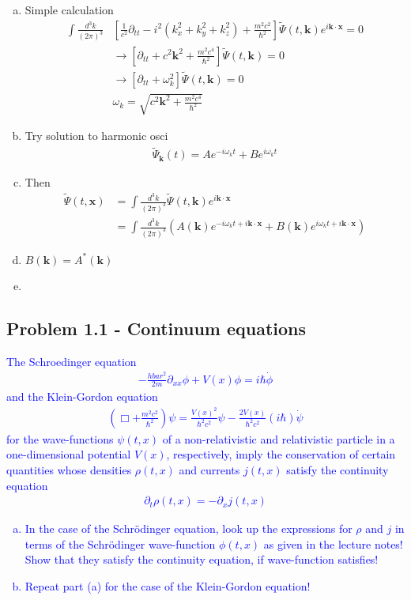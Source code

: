 \documentclass[../main.tex]{subfiles}
\begin{document}
\begin{enumerate}[(a)]
\item Simple calculation
\begin{align}
\int\frac{d^3k}{(2\pi)^3}&\left[\frac{1}{c^2}\partial_{tt}-i^2(k_x^2+k_y^2+k_z^2)+\frac{m^2c^2}{\hbar^2}\right]\tilde{\Psi}(t,\mathbf{k})e^{i\mathbf{k}\cdot\mathbf{x}}=0\\
&\rightarrow\left[\partial_{tt}+c^2\mathbf{k}^2+\frac{m^2c^4}{\hbar^2}\right]\tilde{\Psi}(t,\mathbf{k})=0\\
&\rightarrow\left[\partial_{tt}+\omega_k^2\right]\tilde{\Psi}(t,\mathbf{k})=0\\
&\omega_k=\sqrt{c^2\mathbf{k}^2+\frac{m^2c^4}{\hbar^2}}
\end{align}
\item Try solution to harmonic osci
\begin{align}
\tilde{\Psi}_\mathbf{k}(t)=Ae^{-i\omega_kt}+Be^{i\omega_kt}
\end{align}
\item Then
\begin{align}
\tilde{\Psi}(t,\mathbf{x})
&=\int\frac{d^3k}{(2\pi)^3}\tilde{\Psi}(t,\mathbf{k})e^{i\mathbf{k\cdot x}}\\
&=\int\frac{d^3k}{(2\pi)^3}\left(A(\mathbf{k})e^{-i\omega_kt+i\mathbf{k\cdot x}}+B(\mathbf{k})e^{i\omega_kt+i\mathbf{k\cdot x}}\right)
\end{align}
\item $B(\mathbf{k})=A^*(\mathbf{k})$
\item 
\end{enumerate}


\subsection{Problem 1.1 - Continuum equations}
\textcolor{blue}{The Schroedinger equation
\begin{align}
-\frac{hbar^2}{2m}\partial_{xx}\phi+V(x)\phi=i\hbar\dot{\phi}
\end{align}
and the Klein-Gordon equation
\begin{align}
\left(\Box+\frac{m^2c^2}{\hbar^2}\right)\psi=\frac{V(x)^2}{\hbar^2c^2}\psi-\frac{2V(x)}{\hbar^2c^2}(i\hbar)\dot{\psi}
\end{align}
for the wave-functions $\psi(t,x)$ of a non-relativistic and relativistic particle in a one-dimensional potential $V(x)$, respectively, imply the conservation of certain quantities whose densities $\rho(t,x)$ and currents $j(t,x)$ satisfy the continuity equation
\begin{align}
\partial_t\rho(t,x)=-\partial_xj(t,x)
\end{align}
\begin{enumerate}[(a)]
\item In the case of the Schrödinger equation, look up the expressions for $\rho$ and $j$ in
terms of the Schrödinger wave-function $\phi(t,x)$ as given in the lecture notes! Show
that they satisfy the continuity equation, if wave-function satisfies!
\item Repeat part (a) for the case of the Klein-Gordon equation!
\end{enumerate}
}
\end{document}
